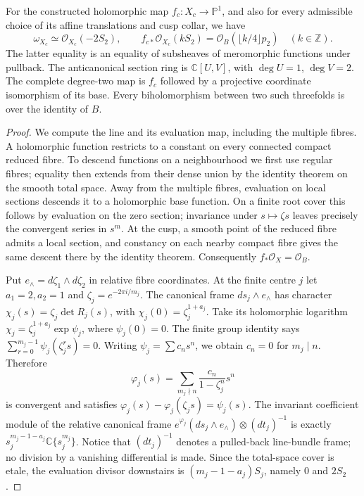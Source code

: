 \begin{proposition}[A.1.1; Proved]\label{st:A.1.1}
For the constructed holomorphic map $f_c:X_c\to\mathbb P^1$, and also for every admissible choice of its affine translations and cusp collar, we have
\[
 \omega_{X_c}\simeq\mathcal O_{X_c}(-2S_2),\qquad
 f_{c*}\mathcal O_{X_c}(kS_2)=\mathcal O_B(\lfloor k/4\rfloor p_2)\quad(k\in\mathbb Z).
\]
The latter equality is an equality of subsheaves of meromorphic functions under pullback. The anticanonical section ring is $\mathbb C[U,V]$, with $\deg U=1$, $\deg V=2$. The complete degree-two map is $f_c$ followed by a projective coordinate isomorphism of its base. Every biholomorphism between two such threefolds is over the identity of $B$.
\end{proposition}
\begin{proof}
We compute the line and its evaluation map, including the multiple fibres. A holomorphic function restricts to a constant on every connected compact reduced fibre. To descend functions on a neighbourhood we first use regular fibres; equality then extends from their dense union by the identity theorem on the smooth total space. Away from the multiple fibres, evaluation on local sections descends it to a holomorphic base function. On a finite root cover this follows by evaluation on the zero section; invariance under $s\mapsto\zeta s$ leaves precisely the convergent series in $s^m$. At the cusp, a smooth point of the reduced fibre admits a local section, and constancy on each nearby compact fibre gives the same descent there by the identity theorem. Consequently $f_*\mathcal O_X=\mathcal O_B$.

Put $e_\wedge=d\zeta_1\wedge d\zeta_2$ in relative fibre coordinates. At the finite centre $j$ let $a_1=2,a_2=1$ and $\zeta_j=e^{-2\pi i/m_j}$. The canonical frame $ds_j\wedge e_\wedge$ has character $\chi_j(s)=\zeta_j\det R_j(s)$, with $\chi_j(0)=\zeta_j^{1+a_j}$. Take its holomorphic logarithm $\chi_j=\zeta_j^{1+a_j}\exp\psi_j$, where $\psi_j(0)=0$. The finite group identity says $\sum_{r=0}^{m_j-1}\psi_j(\zeta_j^r s)=0$. Writing $\psi_j=\sum c_ns^n$, we obtain $c_n=0$ for $m_j\mid n$. Therefore
\[
 \varphi_j(s)=\sum_{m_j\nmid n}\frac{c_n}{1-\zeta_j^n}s^n
\]
is convergent and satisfies $\varphi_j(s)-\varphi_j(\zeta_js)=\psi_j(s)$. The invariant coefficient module of the relative canonical frame
$e^{\varphi_j}(ds_j\wedge e_\wedge)\otimes(dt_j)^{-1}$ is exactly
$s_j^{m_j-1-a_j}\mathbb C\{s_j^{m_j}\}$. Notice that $(dt_j)^{-1}$ denotes a pulled-back line-bundle frame; no division by a vanishing differential is made. Since the total-space cover is etale, the evaluation divisor downstairs is $(m_j-1-a_j)S_j$, namely $0$ and $2S_2$.


\end{proof}
